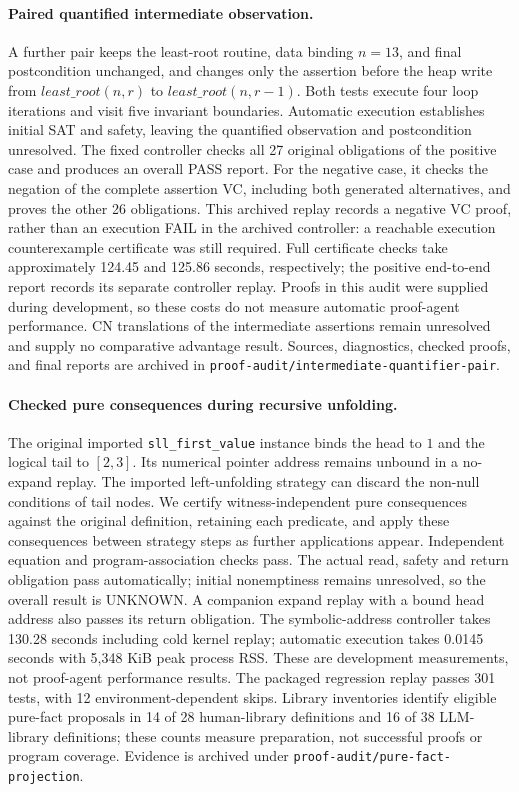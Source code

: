 \paragraph{Paired quantified intermediate observation.}
A further pair keeps the least-root routine, data binding $n=13$, and final
postcondition unchanged, and changes only the assertion before the heap write
from $\mathit{least\_root}(n,r)$ to
$\mathit{least\_root}(n,r-1)$. Both tests execute four loop iterations and
visit five invariant boundaries. Automatic execution establishes initial SAT
and safety, leaving the quantified observation and postcondition unresolved.
The fixed controller checks all 27 original obligations of the positive case
and produces an overall PASS report. For the negative case, it checks the
negation of the complete assertion VC, including both generated alternatives,
and proves the other 26 obligations. This archived replay records a negative VC proof, rather than
an execution FAIL in the archived controller: a reachable execution counterexample certificate was still
required. Full certificate checks take approximately 124.45 and 125.86 seconds,
respectively; the positive end-to-end report records its separate controller
replay. Proofs in this audit were supplied during development, so these costs
do not measure automatic proof-agent performance. CN translations of the
intermediate assertions remain unresolved and supply no comparative advantage
result. Sources, diagnostics, checked proofs, and final reports are archived in
\texttt{proof-audit/intermediate-quantifier-pair}.

\paragraph{Checked pure consequences during recursive unfolding.}
The original imported \texttt{sll\_first\_value} instance binds the head to
$1$ and the logical tail to $[2,3]$. Its numerical pointer address remains
unbound in a no-expand replay. The imported left-unfolding strategy can discard
the non-null conditions of tail nodes. We certify witness-independent pure
consequences against the original definition, retaining each predicate, and
apply these consequences between strategy steps as further applications
appear. Independent equation and program-association checks pass. The actual
read, safety and return obligation pass automatically; initial nonemptiness
remains unresolved, so the overall result is \textsf{UNKNOWN}. A companion
expand replay with a bound head address also passes its return obligation.
The symbolic-address controller takes 130.28 seconds including cold kernel
replay; automatic execution takes 0.0145 seconds with 5,348 KiB peak process
RSS. These are development measurements, not proof-agent performance results.
The packaged regression replay passes 301 tests, with 12 environment-dependent
skips. Library inventories identify eligible pure-fact proposals in 14 of 28
human-library definitions and 16 of 38 LLM-library definitions; these counts
measure preparation, not successful proofs or program coverage.
Evidence is archived under \texttt{proof-audit/pure-fact-projection}.

